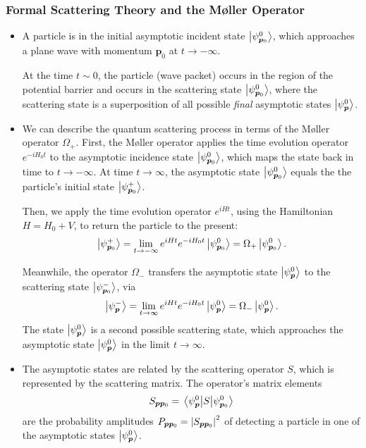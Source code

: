 \documentclass[11pt, a4paper]{article}
\newcommand{\Ham}{Hamiltonian\xspace}
\newcommand{\Mol}{M\o ller\xspace}
\renewcommand{\vec}[1]{\bm{#1}}  %
\begin{document}
\subsubsection{Formal Scattering Theory and the \Mol Operator}
\begin{itemize}
    \item A particle is in the initial asymptotic incident state $ \ket{\psi_{\vec{p}_{0}}^{0}} $, which approaches a plane wave with momentum $ \vec{p}_{0} $ at $ t \to -\infty $. 

    At the time $ t \sim 0 $, the particle (wave packet) occurs in the region of the potential barrier and occurs in the scattering state $ \ket{\psi_{\vec{p}_{0}}^{0}} $, where the scattering state is a superposition of all possible \textit{final} asymptotic states $ \ket{\psi_{\vec{p}}^{0}} $. 

    \item We can describe the quantum scattering process in terms of the \Mol operator $ \Omega_{+} $. First, the \Mol operator applies the time evolution operator $ e^{-i H_{0} t} $ to the asymptotic incidence state $ \ket{\psi_{\vec{p}_{0}}^{0}} $, which maps the state back in time to $ t \to -\infty $. At time $ t \to \infty $, the asymptotic state $ \ket{\psi_{\vec{p}_{0}}^{0}} $ equals the the particle's initial state $ \ket{\psi_{\vec{p}_{0}}^{+}} $. 

    Then, we apply the time evolution operator $ e^{iHt} $, using the \Ham $ H = H_{0} + V $, to return the particle to the present:
    \begin{equation*}
        \ket{\psi_{\vec{p}_{0}}^{+}} = \lim_{t \to - \infty} e^{iHt}e^{-iH_{0}t} \ket{\psi_{\vec{p}_{0}}^{0}} = \Omega_{+} \ket{\psi_{\vec{p}_{0}}^{0}}.
    \end{equation*}

    Meanwhile, the operator $ \Omega_{-} $ transfers the asymptotic state $ \ket{\psi_{\vec{p}}^{0}} $ to the scattering state $ \ket{\psi_{\vec{p}_{0}}^{-}} $, via
    \begin{equation*}
        \ket{\psi_{\vec{p}}^{-}} = \lim_{t \to \infty} e^{iHt}e^{-iH_{0}t}\ket{\psi_{\vec{p}}^{0}} = \Omega_{-} \ket{\psi_{\vec{p}}^{0}}.
    \end{equation*}
    The state $ \ket{\psi_{\vec{p}}^{0}} $ is a second possible scattering state, which approaches the asymptotic state $ \ket{\psi_{\vec{p}}^{0}} $ in the limit $ t \to \infty $. 

    \item The asymptotic states are related by the scattering operator $ S $, which is represented by the scattering matrix. The operator's matrix elements
    \begin{equation*}
        S_{\vec{p}\vec{p}_{0}} = \mel{\psi_{\vec{p}}^{0}}{S}{\psi_{\vec{p}_{0}}^{0}}
    \end{equation*}
    are the probability amplitudes $ P_{\vec{p}\vec{p}_{0}} = \abs{S_{\vec{p}\vec{p}_{0}}}^{2} $ of detecting a particle in one of the asymptotic states $ \ket{\psi_{\vec{p}}^{0}} $. 


\end{itemize}
\end{document}

